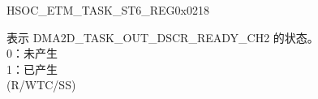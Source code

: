 \addtocounter{Regfloat}{-1}
\begin{register}{H}{SOC\_ETM\_TASK\_ST6\_REG}{0x0218}
\begin{regdesc}\begin{reglist}
\item [接上页...]

\label{fielddesc:SOCETMDMA2DTASKOUTDSCRREADYCH2ST}\item [SOC\_ETM\_DMA2D\_TASK\_OUT\_DSCR\_READY\_CH2\_ST] 表示 DMA2D\_TASK\_OUT\_DSCR\_READY\_CH2 的状态。\\ 0：未产生\\1：已产生\\ (R/WTC/SS)
\end{reglist}\end{regdesc}
\end{register}


